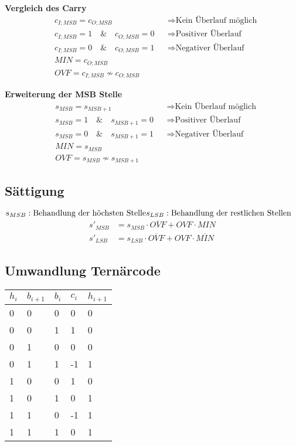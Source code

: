 	\textbf{Vergleich des Carry}
	\begin{align*}
	&c_{I;MSB}= c_{O;MSB}&&\Rightarrow \text{Kein Überlauf möglich}\\
	&c_{I;MSB}=1\quad\&\quad c_{O;MSB}=0&&\Rightarrow \text{Positiver Überlauf}\\
	&c_{I;MSB}=0\quad\&\quad c_{O;MSB}=1&&\Rightarrow \text{Negativer Überlauf}\\
	&\mathit{MIN}=c_{O;MSB}\\
	&\mathit{OVF}=c_{I;MSB}\nsim c_{O;MSB}
	\end{align*}
		
	\textbf{Erweiterung der MSB Stelle}
	\begin{align*}
	&s_{MSB}= s_{MSB+1}&&\Rightarrow \text{Kein Überlauf möglich}\\
	&s_{MSB}=1\quad\&\quad s_{MSB+1}=0&&\Rightarrow \text{Positiver Überlauf}\\
	&s_{MSB}=0\quad\&\quad s_{MSB+1}=1&&\Rightarrow \text{Negativer Überlauf}\\
	&\mathit{MIN}=s_{MSB}\\
	&\mathit{OVF}=s_{MSB}\nsim s_{MSB+1}
	\end{align*}


\subsection{Sättigung}
\(
s_{MSB}: \text{Behandlung der höchsten Stelle}\\
s_{LSB}: \text{Behandlung der restlichen Stellen}
\)
\begin{align*}
s'_{MSB}&=s_{MSB} \cdot \overline{\mathit{OVF}}+\mathit{OVF} \cdot
\mathit{MIN}\\
s'_{LSB}&=s_{LSB} \cdot \overline{\mathit{OVF}}+\mathit{OVF} \cdot
\overline{{MIN}}
\end{align*}

\subsection{Umwandlung Ternärcode}

\begin{tabular}{lll|ll}
$h_i$& $b_{i+1}$&$b_i$&$c_i$&$h_{i+1}$\\
\hline
0&0&0&0&0\\
0&0&1&1&0\\
0&1&0&0&0\\
0&1&1&-1&1\\
1&0&0&1&0\\
1&0&1&0&1\\
1&1&0&-1&1\\
1&1&1&0&1
\end{tabular}